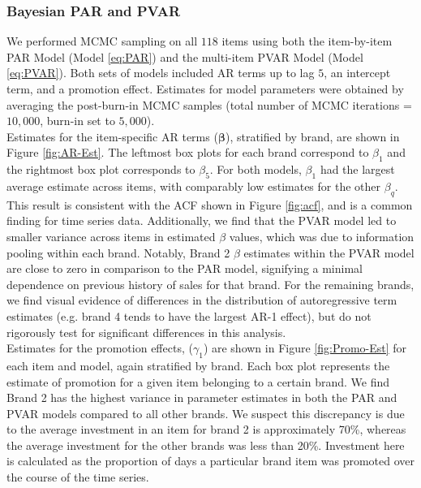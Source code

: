 \documentclass{article}
\begin{document}
\subsubsection{Bayesian PAR and PVAR}
\noindent We performed MCMC sampling on all $118$ items using both the item-by-item PAR Model (Model \ref{eq:PAR}) and the multi-item PVAR Model (Model \ref{eq:PVAR}). Both sets of models included AR terms up to lag $5$, an intercept term, and a promotion effect. Estimates for model parameters were obtained by averaging the post-burn-in MCMC samples (total number of MCMC iterations = $10,000$, burn-in set to $5,000$). \\

\noindent Estimates for the item-specific AR terms ($\boldsymbol{\beta}$), stratified by brand, are shown in Figure \ref{fig:AR-Est}. The leftmost box plots for each brand correspond to $\beta_1$ and the rightmost box plot corresponds to $\beta_5$. For both models, $\beta_1$ had the largest average estimate across items, with comparably low estimates for the other $\beta_q$. This result is consistent with the ACF shown in Figure \ref{fig:acf}, and is a common finding for time series data. Additionally, we find that the PVAR model led to smaller variance across items in estimated $\beta$ values, which was due to information pooling within each brand. Notably, Brand 2 $\beta$ estimates within the PVAR model are close to zero in comparison to the PAR model, signifying a minimal dependence on previous history of sales for that brand. For the remaining brands, we find visual evidence of differences in the distribution of autoregressive term estimates (e.g. brand 4 tends to have the largest AR-1 effect), but do not rigorously test for significant differences in this analysis. \\

\noindent Estimates for the promotion effects, ($\gamma_1$) are shown in Figure \ref{fig:Promo-Est} for each item and model, again stratified by brand. Each box plot represents the estimate of promotion for a given item belonging to a certain brand. We find Brand 2 has the highest variance in parameter estimates in both the PAR and PVAR models compared to all other brands. We suspect this discrepancy is due to the average investment in an item for brand 2 is approximately 70\%, whereas the average investment for the other brands was less than 20\%. Investment here is calculated as the proportion of days a particular brand item was promoted over the course of the time series. 
\end{document}
